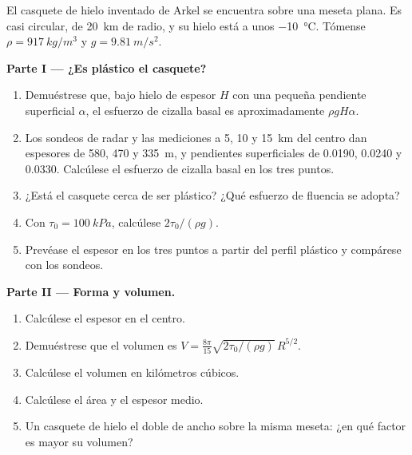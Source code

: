 \begin{problem}
\label{pb:b3:glaciology:1}
El casquete de hielo inventado de Arkel se encuentra sobre una meseta plana. Es casi circular,
de \qty{20}{km} de radio, y su hielo está a unos \qty{-10}{\celsius}. Tómense
$\rho = \qty{917}{kg/m^3}$ y $g = \qty{9.81}{m/s^2}$.

\medskip\noindent\textbf{Parte I --- ¿Es plástico el casquete?}
\begin{enumerate}
\item Demuéstrese que, bajo hielo de espesor $H$ con una pequeña pendiente superficial
  $\alpha$, el esfuerzo de cizalla basal es aproximadamente $\rho gH\alpha$.
\item Los sondeos de radar y las mediciones a 5, 10 y \qty{15}{km} del centro
  dan espesores de 580, 470 y \qty{335}{m}, y pendientes superficiales de
  \num{0.0190}, \num{0.0240} y \num{0.0330}. Calcúlese el esfuerzo de cizalla basal
  en los tres puntos.
\item ¿Está el casquete cerca de ser plástico? ¿Qué esfuerzo de fluencia se adopta?
\item Con $\tau_0 = \qty{100}{kPa}$, calcúlese $2\tau_0/(\rho g)$.
\item Prevéase el espesor en los tres puntos a partir del perfil plástico
  y compárese con los sondeos.
\end{enumerate}

\medskip\noindent\textbf{Parte II --- Forma y volumen.}
\begin{enumerate}[resume]
\item Calcúlese el espesor en el centro.
\item Demuéstrese que el volumen es $V = \frac{8\pi}{15}\sqrt{2\tau_0/(\rho
  g)}\,R^{5/2}$.
\item Calcúlese el volumen en kilómetros cúbicos.
\item Calcúlese el área y el espesor medio.
\item Un casquete de hielo el doble de ancho sobre la misma meseta: ¿en qué factor es mayor su
  volumen?
\end{enumerate}


\end{problem}
